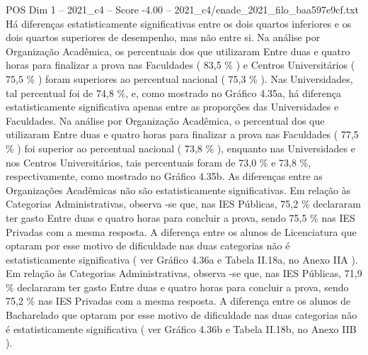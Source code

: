 \begin{textsample}{POS Dim 1 – 2021\_c4 – Score -4.00 – 2021\_c4/enade\_2021\_filo\_baa597e9cf.txt}
Há diferenças estatisticamente significativas entre os dois quartos inferiores e os dois quartos superiores de desempenho, mas não entre si.
Na análise por Organização Acadêmica, os percentuais dos que utilizaram Entre duas e quatro horas para finalizar a prova nas Faculdades ( 83,5 \% ) e Centros Universitários ( 75,5 \% ) foram superiores ao percentual nacional ( 75,3 \% ).
Nas Universidades, tal percentual foi de 74,8 \%, e, como mostrado no Gráfico 4.35a, há diferença estatisticamente significativa apenas entre as proporções das Universidades e Faculdades.
Na análise por Organização Acadêmica, o percentual dos que utilizaram Entre duas e quatro horas para finalizar a prova nas Faculdades ( 77,5 \% ) foi superior ao percentual nacional ( 73,8 \% ), enquanto nas Universidades e nos Centros Universitários, tais percentuais foram de 73,0 \% e 73,8 \%, respectivamente, como mostrado no Gráfico 4.35b.
As diferenças entre as Organizações Acadêmicas não são estatisticamente significativas.
Em relação às Categorias Administrativas, observa -se que, nas IES Públicas, 75,2 \% declararam ter gasto Entre duas e quatro horas para concluir a prova, sendo 75,5 \% nas IES Privadas com a mesma resposta.
A diferença entre os alunos de Licenciatura que optaram por esse motivo de dificuldade nas duas categorias não é estatisticamente significativa ( ver Gráfico 4.36a e Tabela II.18a, no Anexo IIA ).
Em relação às Categorias Administrativas, observa -se que, nas IES Públicas, 71,9 \% declararam ter gasto Entre duas e quatro horas para concluir a prova, sendo 75,2 \% nas IES Privadas com a mesma resposta.
A diferença entre os alunos de Bacharelado que optaram por esse motivo de dificuldade nas duas categorias não é estatisticamente significativa ( ver Gráfico 4.36b e Tabela II.18b, no Anexo IIB ).

\end{textsample}
